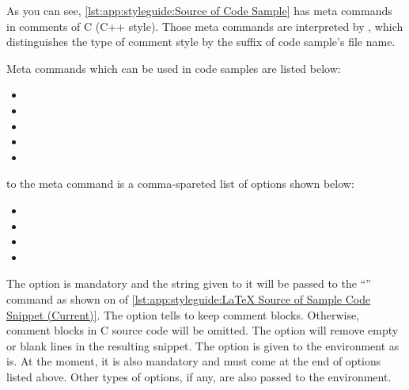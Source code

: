 As you can see, \cref{lst:app:styleguide:Source of Code Sample}
has meta commands in comments of C (C++ style).
Those meta commands are interpreted by ,
which distinguishes the type of comment style by the suffix of code
sample's file name.

Meta commands which can be used in code samples are listed below:

\begin{itemize}[noitemsep]
\item {}
\item {}
\item {}
\item \co{\\fcvexclude}
\item \co{\\fcvblank}
\end{itemize}

 to the  meta command
is a comma-spareted list of options shown below:

\begin{itemize}[noitemsep]
\item {}
\item {}
\item {}
\item {}
\end{itemize}

The  option is mandatory and the string given to it
will be passed to the
``'' command as shown on
 of
\cref{lst:app:styleguide:LaTeX Source of Sample Code Snippet (Current)}.
The  option tells  to keep
comment blocks.
Otherwise, comment blocks in C source code will be omitted.
The  option will remove empty or blank lines
in the resulting snippet.
The  option is given to the  environment
as is.
At the moment, it is also mandatory and must come at the end of options
listed above.
Other types of options, if any, are also passed to the 
environment.

